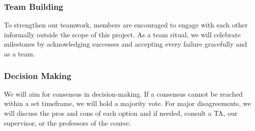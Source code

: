 \documentclass{article}
\begin{document}
\subsubsection*{Team Building}

To strengthen our teamwork, members are encouraged to engage with each other informally outside the scope of this project. As a team ritual, we will celebrate milestones by acknowledging 
successes and accepting every failure gracefully and as a team.

\subsubsection*{Decision Making} 

We will aim for consensus in decision-making. If a consensus cannot be reached within a set timeframe, we will hold a majority vote. For major disagreements, we will discuss the pros and 
cons of each option and if needed, consult a TA, our supervisor, or the professors of the course.
\end{document}
